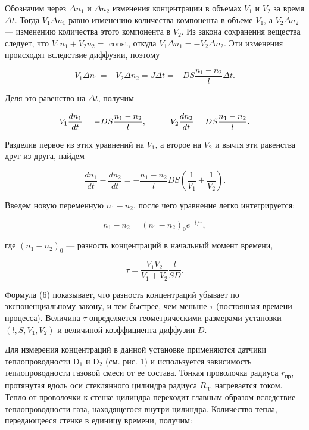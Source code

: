 \documentclass[a4paper,12pt]{article} %
\begin{document}
Обозначим через $\Delta n_{1}$ и $\Delta n_{2}$ изменения концентрации в объемах $V_{1}$ и $V_{2}$ за время $\Delta t$. Тогда $V_{1} \Delta n_{1}$ равно изменению количества компонента в объеме $V_{1}$, а $V_{2}\Delta n_{2}$ — изменению количества этого компонента в $V_{2}$. Из закона сохранения вещества следует, что $V_{1}n_{1} + V_{2}n_{2} = $ const, откуда $V_{1}\Delta n_{1} = -V_{2}\Delta n_{2}$. Эти изменения происходят вследствие диффузии, поэтому


\begin{equation}
	V_{1}\Delta n_{1} = -V_{2}\Delta n_{2} = J\Delta t = -DS \frac{n_{1} - n_{2}}{l}\Delta t.
\end{equation}


\noindent Деля это равенство на $\Delta t$, получим


\begin{equation}
	V_{1}\frac{dn_{1}}{dt} = -DS\frac{n_{1} - n_{2}}{l}, \hspace{10mm} V_{2}\frac{dn_{2}}{dt} = DS\frac{n_{1} - n_{2}}{l}.
\end{equation}


\noindent Разделив первое из этих уравнений на $V_{1}$, а второе на $V_{2}$ и вычтя эти равенства друг из друга, найдем


\begin{equation}
	\frac{dn_{1}}{dt} - \frac{dn_{2}}{dt} = -\frac{n_{1} - n_{2}}{l}DS\left(\frac{1}{V_{1}} + \frac{1}{V_{2}}\right).
\end{equation}


\noindent Введем новую переменную $n_{1} - n_{2}$, после чего уравнение легко интегрируется:


\begin{equation}
	n_{1} - n_{2} = (n_{1} - n_{2})_{0}e^{-t/\tau},
\end{equation}


\noindent где $(n_{1} - n_{2})_{0}$ — разность концентраций в начальный момент времени,


\begin{equation}
	\tau = \frac{V_{1}V_{2}}{V_{1} + V_{2}}\frac{l}{SD}.
\end{equation}


\noindent Формула (6) показывает, что разность концентраций убывает по экспоненциальному закону, и тем быстрее, чем меньше $\tau$ (постоянная времени процесса). Величина $\tau$ определяется геометрическими размерами установки $(l, S, V_{1}, V_{2})$ и величиной коэффициента диффузии $D$.


Для измерения концентраций в данной установке применяются датчики теплопроводности D$_{1}$ и D$_{2}$ (см. рис. 1) и используется зависимость теплопроводности газовой смеси от ее состава. Тонкая проволочка радиуса $r_{\text{пр}}$, протянутая вдоль оси стеклянного цилиндра радиуса $R_{\text{ц}}$, нагревается током. Тепло от проволочки к стенке цилиндра переходит главным образом вследствие теплопроводности газа, находящегося внутри цилиндра. Количество тепла, передающееся стенке в единицу времени, получим:
\end{document}
